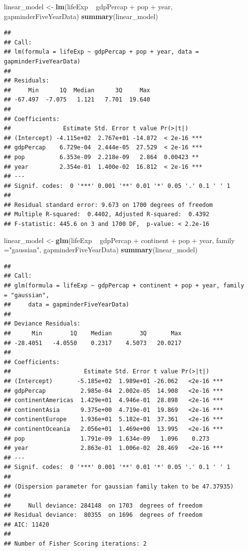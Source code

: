 \documentclass[]{article}
\newenvironment{Shaded}{\begin{snugshade}}{\end{snugshade}}
\newcommand{\KeywordTok}[1]{\textcolor[rgb]{0.13,0.29,0.53}{\textbf{{#1}}}}
\newcommand{\DataTypeTok}[1]{\textcolor[rgb]{0.13,0.29,0.53}{{#1}}}
\newcommand{\StringTok}[1]{\textcolor[rgb]{0.31,0.60,0.02}{{#1}}}
\newcommand{\NormalTok}[1]{{#1}}
\begin{document}
\begin{Shaded}
\begin{Highlighting}[]
\NormalTok{linear_model <-}\StringTok{ }\KeywordTok{lm}\NormalTok{(lifeExp ~}\StringTok{ }\NormalTok{gdpPercap +}\StringTok{ }\NormalTok{pop +}\StringTok{ }\NormalTok{year, gapminderFiveYearData)}
\KeywordTok{summary}\NormalTok{(linear_model)}
\end{Highlighting}
\end{Shaded}

\begin{verbatim}
## 
## Call:
## lm(formula = lifeExp ~ gdpPercap + pop + year, data = gapminderFiveYearData)
## 
## Residuals:
##     Min      1Q  Median      3Q     Max 
## -67.497  -7.075   1.121   7.701  19.640 
## 
## Coefficients:
##               Estimate Std. Error t value Pr(>|t|)    
## (Intercept) -4.115e+02  2.767e+01 -14.872  < 2e-16 ***
## gdpPercap    6.729e-04  2.444e-05  27.529  < 2e-16 ***
## pop          6.353e-09  2.218e-09   2.864  0.00423 ** 
## year         2.354e-01  1.400e-02  16.812  < 2e-16 ***
## ---
## Signif. codes:  0 '***' 0.001 '**' 0.01 '*' 0.05 '.' 0.1 ' ' 1
## 
## Residual standard error: 9.673 on 1700 degrees of freedom
## Multiple R-squared:  0.4402, Adjusted R-squared:  0.4392 
## F-statistic: 445.6 on 3 and 1700 DF,  p-value: < 2.2e-16
\end{verbatim}

\begin{Shaded}
\begin{Highlighting}[]
\NormalTok{linear_model <-}\StringTok{ }\KeywordTok{glm}\NormalTok{(lifeExp ~}\StringTok{ }\NormalTok{gdpPercap +}\StringTok{ }\NormalTok{continent +}\StringTok{ }\NormalTok{pop +}\StringTok{ }\NormalTok{year, }\DataTypeTok{family  =}\StringTok{"gaussian"}\NormalTok{, gapminderFiveYearData)}
\KeywordTok{summary}\NormalTok{(linear_model)}
\end{Highlighting}
\end{Shaded}

\begin{verbatim}
## 
## Call:
## glm(formula = lifeExp ~ gdpPercap + continent + pop + year, family = "gaussian", 
##     data = gapminderFiveYearData)
## 
## Deviance Residuals: 
##      Min        1Q    Median        3Q       Max  
## -28.4051   -4.0550    0.2317    4.5073   20.0217  
## 
## Coefficients:
##                     Estimate Std. Error t value Pr(>|t|)    
## (Intercept)       -5.185e+02  1.989e+01 -26.062   <2e-16 ***
## gdpPercap          2.985e-04  2.002e-05  14.908   <2e-16 ***
## continentAmericas  1.429e+01  4.946e-01  28.898   <2e-16 ***
## continentAsia      9.375e+00  4.719e-01  19.869   <2e-16 ***
## continentEurope    1.936e+01  5.182e-01  37.361   <2e-16 ***
## continentOceania   2.056e+01  1.469e+00  13.995   <2e-16 ***
## pop                1.791e-09  1.634e-09   1.096    0.273    
## year               2.863e-01  1.006e-02  28.469   <2e-16 ***
## ---
## Signif. codes:  0 '***' 0.001 '**' 0.01 '*' 0.05 '.' 0.1 ' ' 1
## 
## (Dispersion parameter for gaussian family taken to be 47.37935)
## 
##     Null deviance: 284148  on 1703  degrees of freedom
## Residual deviance:  80355  on 1696  degrees of freedom
## AIC: 11420
## 
## Number of Fisher Scoring iterations: 2
\end{verbatim}
\end{document}

